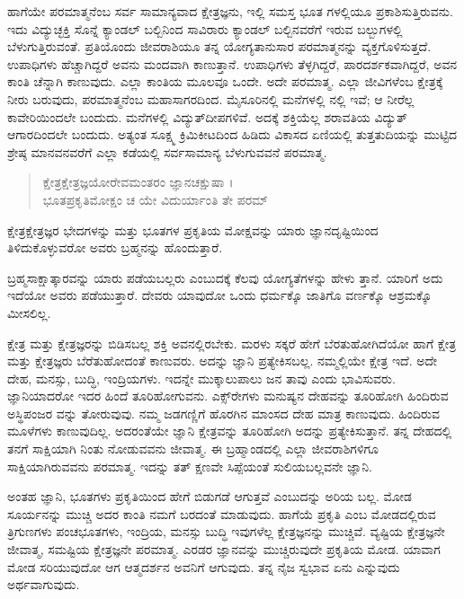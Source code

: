 ಹಾಗೆಯೇ ಪರಮಾತ್ಮನೆಂಬ ಸರ್ವ ಸಾಮಾನ್ಯವಾದ ಕ್ಷೇತ್ರಜ್ಞನು, ಇಲ್ಲಿ ಸಮಸ್ತ ಭೂತ ಗಳಲ್ಲಿಯೂ ಪ್ರಕಾಶಿಸುತ್ತಿರುವನು. ಇದು ವಿದ್ಯುಚ್ಛಕ್ತಿ ಸೊನ್ನೆ ಕ್ಯಾಂಡಲ್ ಬಲ್ಬಿನಿಂದ ಸಾವಿರಾರು ಕ್ಯಾಂಡಲ್ ಬಲ್ಬಿನವರೆಗೆ ಇರುವ ಬಲ್ಬುಗಳಲ್ಲಿ ಬೆಳುಗುತ್ತಿರುವಂತೆ. ಪ್ರತಿಯೊಂದು ಜೀವರಾಶಿಯೂ ತನ್ನ ಯೋಗ್ಯತಾನುಸಾರ ಪರಮಾತ್ಮನನ್ನು ವ್ಯಕ್ತಗೊಳಿಸುತ್ತದೆ. ಉಪಾಧಿಗಳು ಹೆಚ್ಚಾಗಿದ್ದರೆ ಅವನು ಮಂದವಾಗಿ ಕಾಣುತ್ತಾನೆ. ಉಪಾಧಿಗಳು ತೆಳ್ಳಗಿದ್ದರೆ, ಪಾರದರ್ಶಕವಾಗಿದ್ದರೆ, ಅವನ ಕಾಂತಿ ಚೆನ್ನಾಗಿ ಕಾಣುವುದು. ಎಲ್ಲಾ ಕಾಂತಿಯ ಮೂಲವೂ ಒಂದೇ. ಅದೇ ಪರಮಾತ್ಮ. ಎಲ್ಲಾ ಜೀವಿಗಳೆಂಬ ಕ್ಷೇತ್ರಕ್ಕೆ ನೀರು ಬರುವುದು, ಪರಮಾತ್ಮನೆಂಬ ಮಹಾಸಾಗರದಿಂದ. ಮೈಸೂರಿನಲ್ಲಿ ಮನೆಗಳಲ್ಲಿ ನಲ್ಲಿ ಇವೆ; ಆ ನೀರೆಲ್ಲ ಕಾವೇರಿಯಿಂದಲೇ ಬಂದುದು. ಮನೆಗಳಲ್ಲಿ ವಿದ್ಯುತ್​ದೀಪಗಳಿವೆ. ಅದಕ್ಕೆ ಶಕ್ತಿಯೆಲ್ಲ ಶರಾವತಿಯ ವಿದ್ಯುತ್ ಆಗಾರದಿಂದಲೇ ಬಂದುದು. ಅತ್ಯಂತ ಸೂಕ್ಷ್ಮ ಕ್ರಿಮಿಕೀಟದಿಂದ ಹಿಡಿದು ವಿಕಾಸದ ಏಣಿಯಲ್ಲಿ ತುತ್ತತುದಿಯನ್ನು ಮುಟ್ಟಿದ ಶ್ರೇಷ್ಠ ಮಾನವನವರೆಗೆ ಎಲ್ಲಾ ಕಡೆಯಲ್ಲಿ ಸರ್ವಸಾಮಾನ್ಯ ಬೆಳುಗುವವನೆ ಪರಮಾತ್ಮ.

\begin{verse}
ಕ್ಷೇತ್ರಕ್ಷೇತ್ರಜ್ಞಯೋರೇವಮಂತರಂ ಜ್ಞಾನಚಕ್ಷುಷಾ ।\\ಭೂತಪ್ರಕೃತಿಮೋಕ್ಷಂ ಚ ಯೇ ವಿದುರ್ಯಾಂತಿ ತೇ ಪರಮ್ 
\end{verse}

{\small ಕ್ಷೇತ್ರಕ್ಷೇತ್ರಜ್ಞರ ಭೇದಗಳನ್ನು ಮತ್ತು ಭೂತಗಳ ಪ್ರಕೃತಿಯ ಮೋಕ್ಷವನ್ನು ಯಾರು ಜ್ಞಾನದೃಷ್ಟಿಯಿಂದ ತಿಳಿದುಕೊಳ್ಳುವರೋ ಅವರು ಬ್ರಹ್ಮನನ್ನು ಹೊಂದುತ್ತಾರೆ.}

ಬ್ರಹ್ಮಸಾಕ್ಷಾತ್ಕಾರವನ್ನು ಯಾರು ಪಡೆಯಬಲ್ಲರು ಎಂಬುದಕ್ಕೆ ಕೆಲವು ಯೋಗ್ಯತೆಗಳನ್ನು ಹೇಳು ತ್ತಾನೆ. ಯಾರಿಗೆ ಅದು ಇದೆಯೋ ಅವರು ಪಡೆಯುತ್ತಾರೆ. ದೇವರು ಯಾವುದೋ ಒಂದು ಧರ್ಮಕ್ಕೊ ಜಾತಿಗೊ ವರ್ಣಕ್ಕೊ ಆಶ್ರಮಕ್ಕೊ ಮೀಸಲಿಲ್ಲ.

ಕ್ಷೇತ್ರ ಮತ್ತು ಕ್ಷೇತ್ರಜ್ಞರನ್ನು ಬಿಡಿಸಬಲ್ಲ ಶಕ್ತಿ ಅವನಲ್ಲಿರಬೇಕು. ಮರಳು ಸಕ್ಕರೆ ಹೇಗೆ ಬೆರತುಹೋಗಿದೆಯೋ ಹಾಗೆ ಕ್ಷೇತ್ರ ಮತ್ತು ಕ್ಷೇತ್ರಜ್ಞರು ಬೆರೆತುಹೋದಂತೆ ಕಾಣುವರು. ಅದನ್ನು ಜ್ಞಾನಿ ಪ್ರತ್ಯೇಕಿಸಬಲ್ಲ. ನಮ್ಮಲ್ಲಿಯೇ ಕ್ಷೇತ್ರ ಇದೆ. ಅದೇ ದೇಹ, ಮನಸ್ಸು, ಬುದ್ಧಿ, ಇಂದ್ರಿಯಗಳು. ಇದನ್ನೇ ಮುಕ್ಕಾಲುಪಾಲು ಜನ ತಾವು ಎಂದು ಭಾವಿಸುವರು. ಜ್ಞಾನಿಯಾದರೋ ಇದರ ಹಿಂದೆ ತೂರಿಹೋಗುವನು. ಎಕ್ಸ್​ರೇಗಳು ಮನುಷ್ಯನ ದೇಹವನ್ನು ತೂರಿಹೋಗಿ ಹಿಂದಿರುವ ಅಸ್ಥಿಪಂಜರ ವನ್ನು ತೋರುವುವು. ನಮ್ಮ ಜಡಗಣ್ಣಿಗೆ ಹೊರಗಿನ ಮಾಂಸದ ದೇಹ ಮಾತ್ರ ಕಾಣುವುದು. ಹಿಂದಿರುವ ಮೂಳೆಗಳು ಕಾಣುವುದಿಲ್ಲ. ಅದರಂತೆಯೇ ಜ್ಞಾನಿ ಕ್ಷೇತ್ರವನ್ನು ತೂರಿಹೋಗಿ ಅದನ್ನು ಪ್ರತ್ಯೇಕಿಸುತ್ತಾನೆ. ತನ್ನ ದೇಹದಲ್ಲಿ ತನಗೆ ಸಾಕ್ಷಿಯಾಗಿ ನಿಂತು ನೋಡುವವನು ಜೀವಾತ್ಮ. ಈ ಬ್ರಹ್ಮಾಂಡದಲ್ಲಿ ಎಲ್ಲಾ ಜೀವರಾಶಿಗಳಿಗೂ ಸಾಕ್ಷಿಯಾಗಿರುವವನು ಪರಮಾತ್ಮ. ಇದನ್ನು ತತ್ ಕ್ಷಣವೇ ಸಿಪ್ಪೆಯಂತೆ ಸುಲಿಯಬಲ್ಲವನೇ ಜ್ಞಾನಿ.

ಅಂತಹ ಜ್ಞಾನಿ, ಭೂತಗಳು ಪ್ರಕೃತಿಯಿಂದ ಹೇಗೆ ಬಿಡುಗಡೆ ಆಗುತ್ತವೆ ಎಂಬುದನ್ನು ಅರಿಯ ಬಲ್ಲ. ಮೋಡ ಸೂರ್ಯನನ್ನು ಮುಚ್ಚಿ ಅದರ ಕಾಂತಿ ನಮಗೆ ಬರದಂತೆ ಮಾಡುವುದು. ಹಾಗೆಯೆ ಪ್ರಕೃತಿ ಎಂಬ ಮೋಡದಲ್ಲಿರುವ ತ್ರಿಗುಣಗಳು ಪಂಚಭೂತಗಳು, ಇಂದ್ರಿಯ, ಮನಸ್ಸು ಬುದ್ಧಿ ಇವುಗಳೆಲ್ಲ ಕ್ಷೇತ್ರಜ್ಞನನ್ನು ಮುಚ್ಚಿವೆ. ವ್ಯಷ್ಟಿಯ ಕ್ಷೇತ್ರಜ್ಞನೇ ಜೀವಾತ್ಮ, ಸಮಷ್ಟಿಯ ಕ್ಷೇತ್ರಜ್ಞನೇ ಪರಮಾತ್ಮ. ಎರಡರ ಜ್ಞಾನವನ್ನು ಮುಚ್ಚಿರುವುದೇ ಪ್ರಕೃತಿಯ ಮೋಡ. ಯಾವಾಗ ಮೋಡ ಸರಿಯುವುದೋ ಆಗ ಆತ್ಮದರ್ಶನ ಅವನಿಗೆ ಆಗುವುದು. ತನ್ನ ನೈಜ ಸ್ವಭಾವ ಏನು ಎನ್ನುವುದು ಅರ್ಥವಾಗುವುದು.

